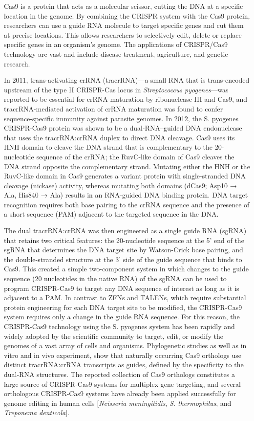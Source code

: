 \documentclass[sn-standardnature]{sn-jnl}%
\theoremstyle{thmstyleone}%
\theoremstyle{thmstyletwo}%
\theoremstyle{thmstylethree}%
\begin{document}
Cas9 is a protein that acts as a molecular scissor, cutting the DNA at a specific location in the genome. By combining the CRISPR system with the Cas9 protein, researchers can use a guide RNA molecule to target specific genes and cut them at precise locations. This allows researchers to selectively edit, delete or replace specific genes in an organism's genome. The applications of CRISPR/Cas9 technology are vast and include disease treatment, agriculture, and genetic research.

In 2011, trans-activating crRNA (tracrRNA)—a small RNA that is trans-encoded upstream of the type II CRISPR-Cas locus in \textit{Streptococcus pyogenes}—was reported to be essential for crRNA maturation by ribonuclease III and Cas9, and tracrRNA-mediated activation of crRNA maturation was found to confer sequence-specific immunity against parasite genomes. In 2012, the S. pyogenes CRISPR-Cas9 protein was shown to be a dual-RNA–guided DNA endonuclease that uses the tracrRNA:crRNA duplex to direct DNA cleavage. Cas9 uses its HNH domain to cleave the DNA strand that is complementary to the 20-nucleotide sequence of the crRNA; the RuvC-like domain of Cas9 cleaves the DNA strand opposite the complementary strand. Mutating either the HNH or the RuvC-like domain in Cas9 generates a variant protein with single-stranded DNA cleavage (nickase) activity, whereas mutating both domains (dCas9; Asp10 → Ala, His840 → Ala) results in an RNA-guided DNA binding protein. DNA target recognition requires both base pairing to the crRNA sequence and the presence of a short sequence (PAM) adjacent to the targeted sequence in the DNA.

The dual tracrRNA:crRNA was then engineered as a single guide RNA (sgRNA) that retains two critical features: the 20-nucleotide sequence at the 5' end of the sgRNA that determines the DNA target site by Watson-Crick base pairing, and the double-stranded structure at the 3' side of the guide sequence that binds to Cas9. This created a simple two-component system in which changes to the guide sequence (20 nucleotides in the native RNA) of the sgRNA can be used to program CRISPR-Cas9 to target any DNA sequence of interest as long as it is adjacent to a PAM. In contrast to ZFNs and TALENs, which require substantial protein engineering for each DNA target site to be modified, the CRISPR-Cas9 system requires only a change in the guide RNA sequence. For this reason, the CRISPR-Cas9 technology using the S. pyogenes system has been rapidly and widely adopted by the scientific community to target, edit, or modify the genomes of a vast array of cells and organisms. Phylogenetic studies as well as in vitro and in vivo experiment, show that naturally occurring Cas9 orthologs use distinct tracrRNA:crRNA transcripts as guides, defined by the specificity to the dual-RNA structures. The reported collection of Cas9 orthologs constitutes a large source of CRISPR-Cas9 systems for multiplex gene targeting, and several orthologous CRISPR-Cas9 systems have already been applied successfully for genome editing in human cells [\textit{Neisseria meningitidis}, \textit{S. thermophilus}, and \textit{Treponema denticola}].
\end{document}
